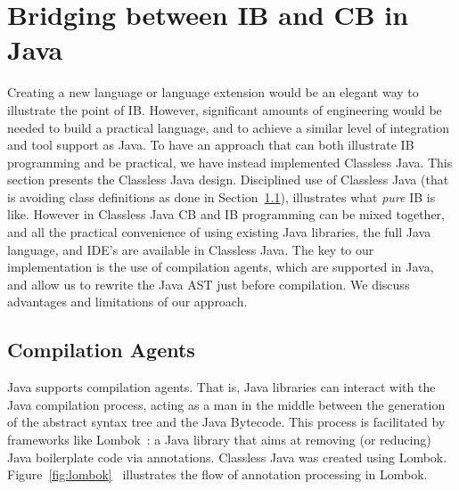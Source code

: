 \section{Bridging between IB and CB in Java}\label{sec:imp}


Creating a new language or language extension would be an
elegant way to illustrate the point of IB. However,
significant amounts of engineering would be needed to build a practical
language, and to achieve a similar level of integration and tool support
as Java. To have an approach that can both illustrate IB
programming and be practical, we have instead implemented Classless Java.
This section presents the Classless Java design.
Disciplined use of Classless Java (that is avoiding class
definitions as done in Section~\ref{}), illustrates what \emph{pure} IB is like.
However in Classless Java CB and IB programming can be mixed together, and all
the practical convenience of using existing Java libraries, the full
Java language, and IDE's are available in Classless Java.
The key to our implementation is the use of compilation agents, which
are supported in Java, and allow us to rewrite the Java AST just
before compilation. We discuss advantages and limitations of our approach.

\subsection{Compilation Agents}
Java supports compilation agents\cite{compilationagents}.
That is, Java libraries can interact with the Java compilation process,
acting as a man in the middle between the
generation of the abstract syntax tree and the Java Bytecode.
This process is facilitated by frameworks like Lombok~\cite{lombok}:
a Java library that aims at removing (or
reducing) Java boilerplate code via
annotations. Classless Java was created using Lombok.
Figure~\ref{fig:lombok}~\cite{neildo2011blog} illustrates the
flow of \mixin annotation processing in Lombok.

